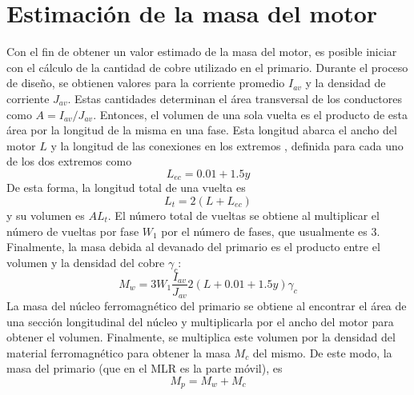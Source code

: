 \section{Estimación de la masa del motor}
Con el fin de obtener un valor estimado de la masa del motor, es posible iniciar con el cálculo de la cantidad de cobre utilizado en el primario. Durante el proceso de diseño, se obtienen valores para la corriente promedio $I_{av}$ y la densidad de corriente $J_{av}$. Estas cantidades determinan el área transversal de los conductores como $A=I_{av}/J_{av}$. Entonces, el volumen de una sola vuelta es el producto de esta área por la longitud de la misma en una fase. Esta longitud abarca el ancho del motor $L$ y la longitud de las conexiones en los extremos \cite{boldea2013}, definida para cada uno de los dos extremos como
\begin{equation}
L_{ec} = 0.01 + 1.5y
\end{equation}
De esta forma, la longitud total de una vuelta es
\begin{equation}
L_t = 2(L + L_{ec})
\end{equation}
y su volumen es $A L_t$. El número total de vueltas se obtiene al multiplicar el número de vueltas por fase $W_1$ por el número de fases, que usualmente es 3. Finalmente, la masa debida al devanado del primario es el producto entre el volumen y la densidad del cobre $\gamma_c$:
\begin{equation}
M_w = 3W_1\frac{I_{av}}{J_{av}}2(L+0.01+1.5y)\gamma_c
\end{equation}
La masa del núcleo ferromagnético del primario se obtiene al encontrar el área de una sección longitudinal del núcleo y multiplicarla por el ancho del motor para obtener el volumen. Finalmente, se multiplica este volumen por la densidad del material ferromagnético para obtener la masa $M_c$ del mismo. De este modo, la masa del primario (que en el MLR es la parte móvil), es
\begin{equation}
M_p = M_w + M_c
\end{equation}

